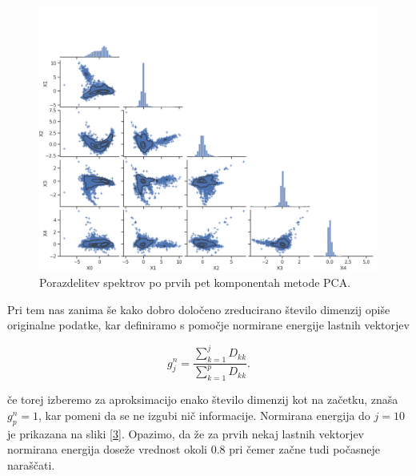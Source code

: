 \documentclass[11pt,a4paper]{article}
\begin{document}
\begin{figure}[h]
    \centering
    \hbox{\hspace{0em}\includegraphics[scale=0.6]{corner_plot}}
    \caption{Porazdelitev spektrov po prvih pet komponentah metode PCA.}
    \label{2}
\end{figure}

Pri tem nas zanima še kako dobro določeno zreducirano število dimenzij opiše originalne podatke, kar definiramo s pomočje normirane energije lastnih vektorjev

\begin{equation}
	g_j^n = \frac{\sum_{k=1}^jD_{kk}}{\sum_{k=1}^pD_{kk}}.
\end{equation}

če torej izberemo za aproksimacijo enako število dimenzij kot na začetku, znaša $g_p^n=1$, kar pomeni da se ne izgubi nič informacije. Normirana energija do $j=10$ je prikazana na sliki \ref{3}. Opazimo, da že za prvih nekaj lastnih vektorjev normirana energija doseže vrednost okoli 0.8 pri čemer začne tudi počasneje naraščati.

\clearpage
\end{document}
